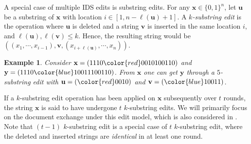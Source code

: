 \documentclass[onecolumn]{IEEEtran}
\newtheorem{example}{Example}
\newcommand{\bl}{n}
\newcommand{\numedits}{t}
\newcommand{\editsize}{k}
\newcommand{\length}[1]{{\ell}(#1)}
\newcommand{\insdel}{IDS\xspace}
\newcommand{\bfu}{{\mathbf{ u}}}
\newcommand{\bfv}{{\mathbf{ v}}}
\newcommand{\bfx}{{\mathbf{ x}}}
\newcommand{\vr}[1]{{\color{red} {\small [VR: #1]} }}
\begin{document}
A special case of multiple \insdel edits is substring edits. For any $\mathbf{x} \in \{0,1\}^\bl$, let $\bfu$ be a substring of $\bfx$ with location $i\in [1,n-\length{\bfu}+1]$. A \emph{$\editsize$-substring edit} is the operation where $\mathbf{u}$ is deleted and a string $\mathbf{v}$ is inserted in the same location $i$, and $\length{\mathbf{u}}, \length{\mathbf{v}} \leq \editsize$. Hence, the resulting string would be $((x_1,\cdots,x_{i-1}), \bfv, (x_{i+\length{\bfu}}, \cdots, x_\bl))$.
\begin{example}
    Consider $\mathbf{x} = (1110{\color{red}0010}100110)$ and $\mathbf{y} = (1110{\color{blue}10011}100110)$. From $\mathbf{x}$ one can get $\mathbf{y}$ through a $5$-substring edit with $\mathbf{u} = ({\color{red}0010})$ and $\mathbf{v} = ({\color{blue}10011})$. %
\end{example}

If a $\editsize$-substring edit operation has been applied on $\mathbf{x}$ subsequently over $\numedits$ rounds, the string $\mathbf{x}$ is said to have undergone $\numedits$ $\editsize$-substring edits. We will primarily focus on the document exchange under this edit model, which is also considered in \cite{Li_Distributed_graph_coloring}. Note that $(\numedits-1)$ $\editsize$-substring edit is a special case of $\numedits$ $\editsize$-substring edit, where the deleted and inserted strings are \emph{identical} in at least one round.



\end{document}
